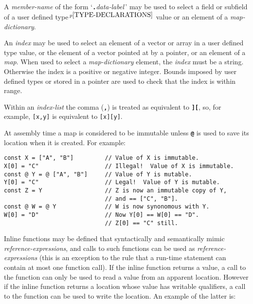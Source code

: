 \documentclass[12pt]{article}
\newcommand{\TT}[1]{{\tt \bfseries #1}}
\newcommand{\pagnote}[1]{$\,^{p\pageref{#1}}$}
\newcommand{\EOL}{\penalty \exhyphenpenalty}
\newenvironment{indpar}[1][0.3in]%
	{\begin{list}{}%
		     {\setlength{\itemsep}{0in}%
		      \setlength{\topsep}{0in}%
		      \setlength{\parsep}{1ex}%
		      \setlength{\labelwidth}{#1}%
		      \setlength{\leftmargin}{#1}%
		      \addtolength{\leftmargin}{\labelsep}}%
	 \item}%
	{\end{list}}
\begin{document}
A {\em member-name} of the form `\TT{.}{\em data-label}\,'
may be used to select a field or subfield
of a user defined type\pagnote{TYPE-DECLARATIONS} value or
an element of a {\em map-dictionary}.

An {\em index} may be used to select an element of a vector
or array in a
user defined type value, or the
element of a vector pointed at by a pointer, or an element
of a {\em map}.  When used to select a {\em map-dictionary}
element, the {\em index} must be a string.  Otherwise the
index is a positive or negative integer.  Bounds imposed
by user defined types or stored in a pointer are used to
check that the index is within range.

Within an {\em index-list} the comma (\TT{,}) is treated
as equivalent to \TT{][}, so, for example, {\tt [x,y]}
is equivalent to {\tt [x][y]}.

At assembly time a map is considered to be immutable unless
\TT{@} is used to save its location when it is created.  For example:
\begin{indpar}\begin{verbatim}
const X = ["A", "B"]         // Value of X is immutable.
X[0] = "C"                   // Illegal!  Value of X is immutable.
const @ Y = @ ["A", "B"]     // Value of Y is mutable.
Y[0] = "C"                   // Legal!  Value of Y is mutable.
const Z = Y                  // Z is now an immutable copy of Y,
                             // and == ["C", "B"].
const @ W = @ Y              // W is now synonomous with Y.
W[0] = "D"                   // Now Y[0] == W[0] == "D".
                             // Z[0] == "C" still.
\end{verbatim}\end{indpar}


Inline functions may be defined that syntactically and semantically mimic
{\em reference-\EOL expres\-sions}, and calls to such functions
can be used as {\em reference-expressions} (this is an exception
to the rule that a run-time statement can contain at most one function
call).  If the inline function returns a value, a call to the function
can only be used to read a value from an apparent
location.  However if the inline function returns a location whose
value has writable qualifiers, a call to the function can be used
to write the location.  An example of the latter is:
\label{REFERENCE-EXPRESSION-FUNCTION-EXAMPLE}
\end{document}
